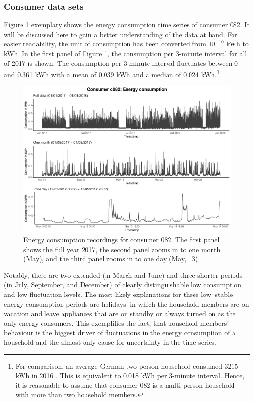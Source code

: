 \subsubsection{Consumer data sets}

Figure \ref{Fig:energycons_c082} exemplary shows the energy consumption time series of consumer 082. It will be discussed here to gain a better understanding of the data at hand. For easier readability, the unit of consumption has been converted from $10^{-10}$ kWh to kWh. In the first panel of Figure \ref{Fig:energycons_c082}, the consumption per 3-minute interval for all of 2017 is shown. The consumption per 3-minute interval fluctuates between 0 and 0.361 kWh with a mean of 0.039 kWh and a median of 0.024 kWh.\footnote{For comparison, an average German two-person household consumed 3215 kWh in 2016 \citep{Destatis:2018}. This is equivalent to 0.018 kWh per 3-minute interval. Hence, it is reasonable to assume that consumer 082 is a multi-person household with more than two household members.}

\begin{figure}[htbp]
 \centering
\includegraphics[width=\textwidth]{thesis/graphs/timeseries/c082_cons.pdf}
\caption[Energy consumption recordings for consumer 082]{Energy consumption recordings for consumer 082. The first panel shows the full year 2017, the second panel zooms in to one month (May), and the third panel zooms in to one day (May, 13). \quantnet}
\label{Fig:energycons_c082}
\end{figure}

Notably, there are two extended (in March and June) and three shorter periods (in July, September, and December) of clearly distinguishable low consumption and low fluctuation levels. The most likely explanations for these low, stable energy consumption periods are holidays, in which the household members are on vacation and leave appliances that are on standby or always turned on as the only energy consumers. This exemplifies the fact, that household members' behaviour is the biggest driver of fluctuations in the energy consumption of a household and the almost only cause for uncertainty in the time series.

